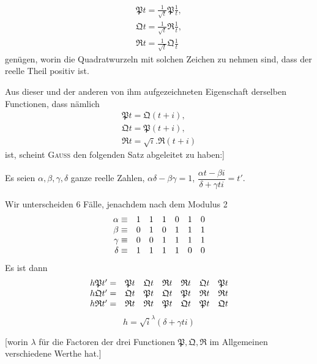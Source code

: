\[
\begin{gathered}\mathfrak{P}t=\frac1{\surd t}\mathfrak{P}\frac1t,\\[5pt]
\mathfrak{Q}t=\frac1{\surd t}\mathfrak{R}\frac1t,\\[5pt]
\mathfrak{R}t=\frac1{\surd t}\mathfrak{Q}\frac1t\end{gathered}
\]
genügen, worin die Quadratwurzeln mit solchen Zeichen zu nehmen sind, dass
der reelle Theil positiv ist.

Aus dieser und der anderen von ihm aufgezeichneten Eigenschaft derselben
Functionen, dass nämlich
\[
\begin{gathered}\mathfrak{P}t=\mathfrak{Q}(t+i),\\[5pt]
\mathfrak{Q}t=\mathfrak{P}(t+i),\\[5pt]
\mathfrak{R}t=\surd i.\mathfrak{R}(t+i)\end{gathered}
\]
ist, scheint \textsc{Gauss} den folgenden Satz abgeleitet zu haben:]

\begin{itshape}
Es seien $\alpha,\allowbreak \beta,\allowbreak \gamma,\allowbreak \delta$ ganze reelle Zahlen, $\alpha\delta-\beta\gamma=1$,
$\dfrac{\alpha t-\beta i}{\delta+\gamma ti}=t'$.

Wir unterscheiden 6 Fälle, jenachdem nach dem Modulus 2
\[
\begin{array}{r@{\;}c@{\quad}cccccc}
\alpha&\equiv&1&1&1&0&1&0\\
\beta&\equiv&0&1&0&1&1&1\\
\gamma&\equiv&0&0&1&1&1&1\\
\delta&\equiv&1&1&1&1&0&0
\end{array}
\]
Es ist dann
\[
\begin{array}{r@{\;}c@{\quad}cccccc}
h\mathfrak{P}t'&=&\mathfrak{P}t&\mathfrak{Q}t&\mathfrak{R}t&\mathfrak{R}t&\mathfrak{Q}t&\mathfrak{P}t\\
h\mathfrak{Q}t'&=&\mathfrak{Q}t&\mathfrak{P}t&\mathfrak{Q}t&\mathfrak{P}t&\mathfrak{R}t&\mathfrak{R}t\\
h\mathfrak{R}t'&=&\mathfrak{R}t&\mathfrak{R}t&\mathfrak{P}t&\mathfrak{Q}t&\mathfrak{P}t&\mathfrak{Q}t
\end{array}
\]
\[
h=\surd i^\lambda(\delta+\gamma ti)
\]
\end{itshape}

[worin $\lambda$ für die Factoren der drei Functionen $\mathfrak{P},\allowbreak \mathfrak{Q},\allowbreak \mathfrak{R}$ im Allgemeinen verschiedene
Werthe hat.]

